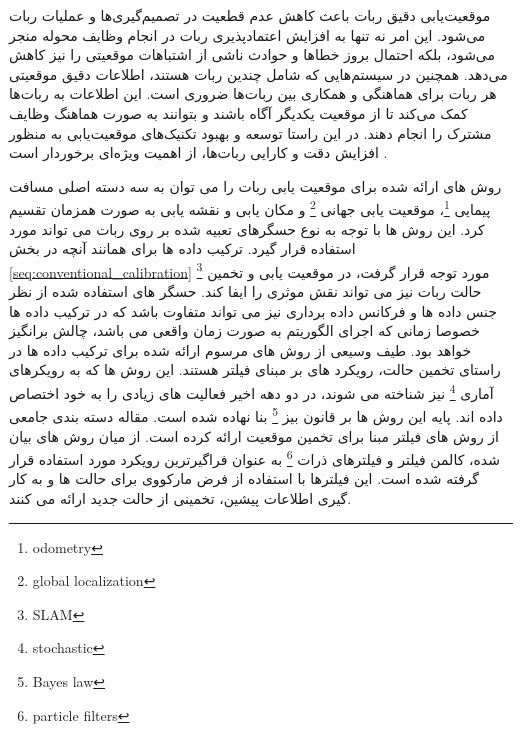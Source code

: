 موقعیت‌یابی دقیق ربات باعث کاهش عدم قطعیت در تصمیم‌گیری‌ها و عملیات ربات می‌شود. این امر نه تنها به افزایش اعتمادپذیری ربات در انجام وظایف محوله منجر می‌شود، بلکه احتمال بروز خطاها و حوادث ناشی از اشتباهات موقعیتی را نیز کاهش می‌دهد. همچنین در سیستم‌هایی که شامل چندین ربات هستند، اطلاعات دقیق موقعیتی هر ربات برای هماهنگی و همکاری بین ربات‌ها ضروری است. این اطلاعات به ربات‌ها کمک می‌کند تا از موقعیت یکدیگر آگاه باشند و بتوانند به صورت هماهنگ وظایف مشترک را انجام دهند. در این راستا توسعه و بهبود تکنیک‌های موقعیت‌یابی به منظور افزایش دقت و کارایی ربات‌ها، از اهمیت ویژه‌ای برخوردار است
\cite{aragues2011multi}.


روش های ارائه شده برای موقعیت یابی ربات را می توان به سه دسته اصلی مسافت پیمایی
\footnote{odometry}،
موقعیت یابی جهانی
\footnote{global localization}
و مکان یابی و نقشه یابی به صورت همزمان
تقسیم کرد. این روش ها با توجه به نوع حسگرهای تعبیه شده بر روی ربات می تواند مورد استفاده قرار گیرد. ترکیب داده ها برای همانند آنچه در بخش
\ref{seq:conventional_calibration}
\footnote{SLAM}
مورد توجه قرار گرفت، در موقعیت یابی و تخمین حالت ربات نیز می تواند نقش موثری را ایفا کند. حسگر های استفاده شده از نظر جنس داده ها و فرکانس داده برداری نیز می تواند متفاوت باشد که در ترکیب داده ها خصوصا زمانی که اجرای الگوریتم به صورت زمان واقعی می باشد، چالش برانگیز خواهد بود. طیف وسیعی از روش های مرسوم ارائه شده برای ترکیب داده ها در راستای تخمین حالت، رویکرد های بر مبنای فیلتر هستند. این روش ها که به رویکرهای آماری 
\footnote{stochastic}
نیز شناخته می شوند، در دو دهه اخیر فعالیت های زیادی را به خود اختصاص داده اند. پایه این روش ها بر قانون بیز
\footnote{Bayes law}
بنا نهاده شده است. مقاله
\cite{panigrahi2022localization} 
دسته بندی جامعی از روش های فیلتر مبنا برای تخمین موقعیت ارائه کرده است. از میان روش های بیان شده، کالمن فیلتر و فیلترهای ذرات
\footnote{particle filters}
به عنوان فراگیرترین رویکرد مورد استفاده قرار گرفته شده است. این فیلترها با استفاده از فرض مارکووی برای حالت ها و به کار گیری اطلاعات پیشین، تخمینی از حالت جدید ارائه می کنند. 

